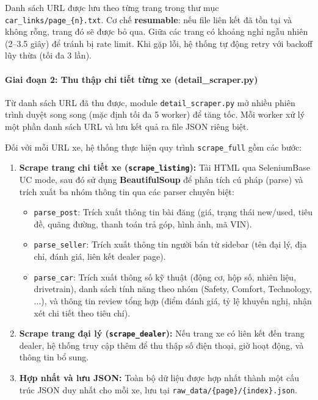 Danh sách URL được lưu theo từng trang trong thư mục \texttt{car\_links/page\_\{n\}.txt}. Cơ chế \textbf{resumable}: nếu file liên kết đã tồn tại và không rỗng, trang đó sẽ được bỏ qua. Giữa các trang có khoảng nghỉ ngẫu nhiên (2--3.5 giây) để tránh bị rate limit. Khi gặp lỗi, hệ thống tự động retry với backoff lũy thừa (tối đa 3 lần).

\paragraph{Giai đoạn 2: Thu thập chi tiết từng xe (detail\_scraper.py)}

Từ danh sách URL đã thu được, module \texttt{detail\_scraper.py} mở nhiều phiên trình duyệt song song (mặc định tối đa 5 worker) để tăng tốc. Mỗi worker xử lý một phần danh sách URL và lưu kết quả ra file JSON riêng biệt.

Đối với mỗi URL xe, hệ thống thực hiện quy trình \texttt{scrape\_full} gồm các bước:
\begin{enumerate}
    \item \textbf{Scrape trang chi tiết xe (\texttt{scrape\_listing}):} Tải HTML qua SeleniumBase UC mode, sau đó sử dụng \textbf{BeautifulSoup} để phân tích cú pháp (parse) và trích xuất ba nhóm thông tin qua các parser chuyên biệt:
    \begin{itemize}
        \item \texttt{parse\_post}: Trích xuất thông tin bài đăng (giá, trạng thái new/used, tiêu đề, quãng đường, thanh toán trả góp, hình ảnh, mã VIN).
        \item \texttt{parse\_seller}: Trích xuất thông tin người bán từ sidebar (tên đại lý, địa chỉ, đánh giá, liên kết dealer page).
        \item \texttt{parse\_car}: Trích xuất thông số kỹ thuật (động cơ, hộp số, nhiên liệu, drivetrain), danh sách tính năng theo nhóm (Safety, Comfort, Technology, ...), và thông tin review tổng hợp (điểm đánh giá, tỷ lệ khuyến nghị, nhận xét chi tiết theo tiêu chí).
    \end{itemize}
    \item \textbf{Scrape trang đại lý (\texttt{scrape\_dealer}):} Nếu trang xe có liên kết đến trang dealer, hệ thống truy cập thêm để thu thập số điện thoại, giờ hoạt động, và thông tin bổ sung.
    \item \textbf{Hợp nhất và lưu JSON:} Toàn bộ dữ liệu được hợp nhất thành một cấu trúc JSON duy nhất cho mỗi xe, lưu tại \texttt{raw\_data/\{page\}/\{index\}.json}.
\end{enumerate}

